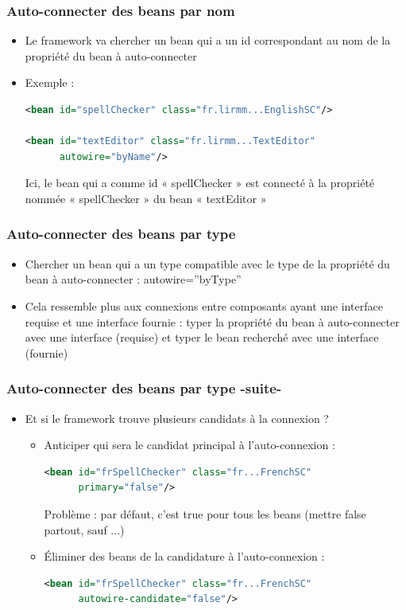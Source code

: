 \documentclass{beamer}
\begin{document}
\begin{frame}[fragile]
  \frametitle{Auto-connecter des beans par nom}
  \begin{itemize}
  \item Le framework va chercher un bean qui a un id correspondant
    au nom de la propriété du bean à auto-connecter
  \item Exemple :
\begin{lstlisting}[language=XML,basicstyle=\scriptsize]    
<bean id="spellChecker" class="fr.lirmm...EnglishSC"/>
  
<bean id="textEditor" class="fr.lirmm...TextEditor"
      autowire="byName"/>
\end{lstlisting}
Ici, le bean qui a comme id « spellChecker » est connecté à la
propriété nommée « spellChecker » du bean « textEditor »
  \end{itemize}
\end{frame}

\begin{frame}[fragile]
  \frametitle{Auto-connecter des beans par type}
  \begin{itemize}
  \item Chercher un bean qui a un type compatible avec le type de la
    propriété du bean à auto-connecter : autowire=''byType''
  \item Cela ressemble plus aux connexions entre composants ayant une
    interface requise et une interface fournie : typer la propriété du
    bean à auto-connecter avec une interface (requise) et typer le
    bean recherché avec une interface (fournie)
  \end{itemize}
\end{frame}

\begin{frame}[fragile]
  \frametitle{Auto-connecter des beans par type -suite-}
  \begin{itemize}
\item Et si le framework trouve plusieurs candidats à la connexion ?
\begin{itemize}
\item Anticiper qui sera le candidat principal à l'auto-connexion :
\begin{lstlisting}[language=XML,basicstyle=\scriptsize]    
<bean id="frSpellChecker" class="fr...FrenchSC"
      primary="false"/>
\end{lstlisting}
Problème : par défaut, c'est true pour tous les beans (mettre false partout, sauf ...)
\item Éliminer des beans de la candidature à l'auto-connexion :
\begin{lstlisting}[language=XML,basicstyle=\scriptsize]    
<bean id="frSpellChecker" class="fr...FrenchSC"
      autowire-candidate="false"/>
\end{lstlisting}
  \end{itemize}
  \end{itemize}
\end{frame}
\end{document}
